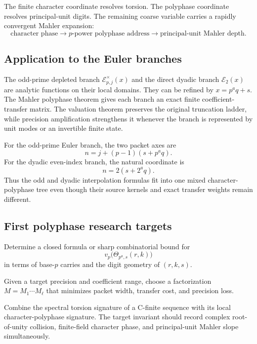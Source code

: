 \begin{principle}
The finite character coordinate resolves torsion. The polyphase coordinate resolves principal-unit digits. The remaining coarse variable carries a rapidly convergent Mahler expansion:
\[
 \boxed{\text{character phase}\longrightarrow\text{$p$-power polyphase address}\longrightarrow\text{principal-unit Mahler depth}.}
\]
\end{principle}

\subsection{Application to the Euler branches}
The odd-prime depleted branch $\mathscr E_{p,j}^\times(x)$ and the direct dyadic branch $\mathscr E_2(x)$ are analytic functions on their local domains. They can be refined by $x=p^aq+s$. The Mahler polyphase theorem gives each branch an exact finite coefficient-transfer matrix. The valuation theorem preserves the original truncation ladder, while precision amplification strengthens it whenever the branch is represented by unit modes or an invertible finite state.

For the odd-prime Euler branch, the two packet axes are
\[
 n=j+(p-1)(s+p^aq).
\]
For the dyadic even-index branch, the natural coordinate is
\[
 n=2(s+2^aq).
\]
Thus the odd and dyadic interpolation formulas fit into one mixed character-polyphase tree even though their source kernels and exact transfer weights remain different.

\subsection{First polyphase research targets}
\begin{problem}
Determine a closed formula or sharp combinatorial bound for
\[
 v_p\bigl(\Theta_{p^a,s}(r,k)\bigr)
\]
in terms of base-$p$ carries and the digit geometry of $(r,k,s)$.
\end{problem}

\begin{problem}
Given a target precision and coefficient range, choose a factorization $M=M_1\cdots M_\ell$ that minimizes packet width, transfer cost, and precision loss.
\end{problem}

\begin{problem}
Combine the spectral torsion signature of a C-finite sequence with its local character-polyphase signature. The target invariant should record complex root-of-unity collision, finite-field character phase, and principal-unit Mahler slope simultaneously.
\end{problem}

